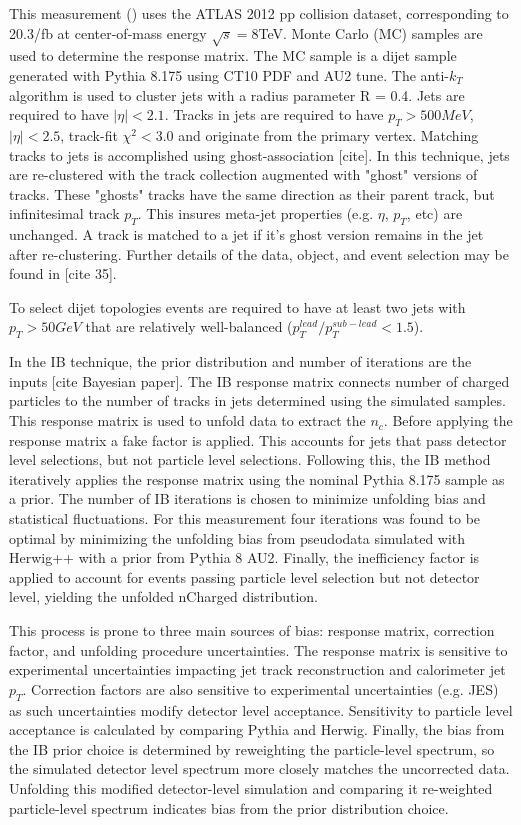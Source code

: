 This measurement (\cite{Unfolding}) uses the ATLAS 2012 pp collision dataset, corresponding to 20.3/fb at center-of-mass energy $\sqrt{s}=8$TeV. Monte Carlo (MC) samples are used to determine the response matrix. The MC sample is a dijet sample generated with Pythia 8.175 using CT10 PDF and AU2 tune.  The anti-$k_{T}$ algorithm is used to cluster jets with a radius parameter R = 0.4. Jets are required to have $|\eta| < 2.1$. Tracks in jets are required to have $p_{T}>500MeV$, $|\eta|<2.5$, track-fit $\chi^{2} < 3.0$ and originate from the primary vertex. Matching tracks to jets is accomplished using ghost-association [cite]. In this technique, jets are re-clustered with the track collection augmented with "ghost" versions of tracks.  These "ghosts" tracks have the same direction as their parent track, but infinitesimal track $p_{T}$. This insures meta-jet properties (e.g. $\eta$, $p_{T}$, etc) are unchanged. A track is matched to a jet if it's ghost version remains in the jet after re-clustering. Further details of the data, object, and event selection may be found in [cite 35].

To select dijet topologies events are required to have at least two jets with $p_{T} > 50GeV$ that are relatively well-balanced ($p_{T}^{lead}/p_{T}^{sub-lead} < 1.5$). 

In the IB technique, the prior distribution and number of iterations are the inputs [cite Bayesian paper]. The IB response matrix connects number of charged particles to the number of tracks in jets determined using the simulated samples. This response matrix is used to unfold data to extract the $n_{c}$. Before applying the response matrix a fake factor is applied. This accounts for jets that pass detector level selections, but not particle level selections. Following this, the IB method iteratively applies the response matrix using the nominal Pythia 8.175 sample as a prior. The number of IB iterations is chosen to minimize unfolding bias and statistical fluctuations. For this measurement four iterations was found to be optimal by minimizing the unfolding bias from pseudodata simulated with Herwig++ with a prior from Pythia 8 AU2. Finally, the inefficiency factor is applied to account for events passing particle level selection but not detector level, yielding the unfolded nCharged distribution.
 
This process is prone to three main sources of bias: response matrix, correction factor, and unfolding procedure uncertainties. The response matrix is sensitive to experimental uncertainties impacting jet track reconstruction and calorimeter jet $p_{T}$. Correction factors are also sensitive to experimental uncertainties (e.g. JES) as such uncertainties modify detector level acceptance. Sensitivity to particle level acceptance is calculated by comparing Pythia and Herwig. Finally, the bias from the IB prior choice is determined by reweighting the particle-level spectrum, so the simulated detector level spectrum more closely matches the uncorrected data. Unfolding this modified detector-level simulation and comparing it re-weighted particle-level spectrum indicates bias from the prior distribution choice.

